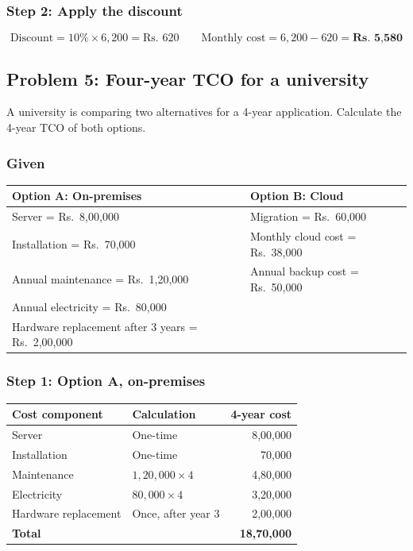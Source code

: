 \documentclass[11pt,a4paper]{article}
\begin{document}
\subsubsection*{Step 2: Apply the discount}

\[
\text{Discount} = 10\% \times 6{,}200 = \text{Rs. } 620 \qquad
\text{Monthly cost} = 6{,}200 - 620 = \textbf{Rs. 5,580}
\]

\subsection*{Problem 5: Four-year TCO for a university}

A university is comparing two alternatives for a 4-year application. Calculate the 4-year TCO
of both options.

\subsubsection*{Given}

\begin{tabularx}{\textwidth}{@{}XX@{}}
\toprule
\rowcolor{tablehead}\textbf{Option A: On-premises} & \textbf{Option B: Cloud} \\
\midrule
Server = Rs.\ 8,00,000 & Migration = Rs.\ 60,000 \\
Installation = Rs.\ 70,000 & Monthly cloud cost = Rs.\ 38,000 \\
Annual maintenance = Rs.\ 1,20,000 & Annual backup cost = Rs.\ 50,000 \\
Annual electricity = Rs.\ 80,000 & \\
Hardware replacement after 3 years = Rs.\ 2,00,000 & \\
\bottomrule
\end{tabularx}

\subsubsection*{Step 1: Option A, on-premises}

\begin{tabularx}{\textwidth}{@{}lXr@{}}
\toprule
\rowcolor{tablehead}\textbf{Cost component} & \textbf{Calculation} & \textbf{4-year cost} \\
\midrule
Server & One-time & 8,00,000 \\
Installation & One-time & 70,000 \\
Maintenance & $1{,}20{,}000 \times 4$ & 4,80,000 \\
Electricity & $80{,}000 \times 4$ & 3,20,000 \\
Hardware replacement & Once, after year 3 & 2,00,000 \\
\midrule
\textbf{Total} & & \textbf{18,70,000} \\
\bottomrule
\end{tabularx}
\end{document}
